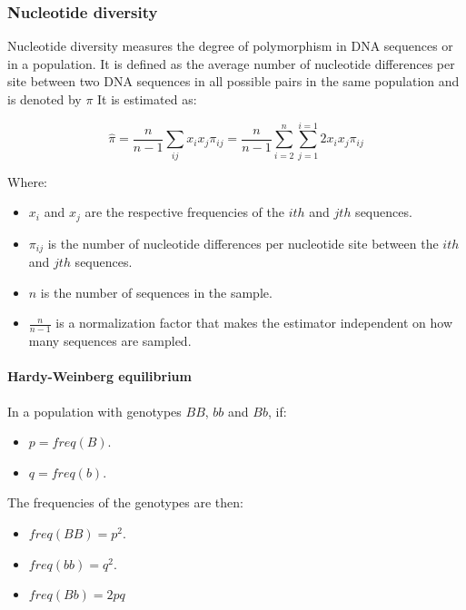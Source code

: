 		\subsubsection{Nucleotide diversity}
		Nucleotide diversity measures the degree of polymorphism in DNA sequences or in a population.
		It is defined as the average number of nucleotide differences per site between two DNA sequences in all possible pairs in the same population and is denoted by $\pi$
		It is estimated as:

		$$\hat{\pi} = \frac{n}{n-1}\sum\limits_{ij} x_ix_j\pi_{ij} = \frac{n}{n-1} \sum\limits_{i=2}^n\sum\limits_{j=1}^{i=1}2x_ix_j\pi_{ij}$$

		Where:

		\begin{multicols}{2}
			\begin{itemize}
				\item $x_i$ and $x_j$ are the respective frequencies of the $ith$ and $jth$ sequences.
				\item	$\pi_{ij}$ is the number of nucleotide differences per nucleotide site between the $ith$ and $jth$ sequences.
				\item $n$ is the number of sequences in the sample.
				\item $\frac{n}{n-1}$ is a normalization factor that makes the estimator independent on how many sequences are sampled.
			\end{itemize}
		\end{multicols}

			\paragraph{Hardy-Weinberg equilibrium}
			In a population with genotypes $BB$, $bb$ and $Bb$, if:

			\begin{multicols}{2}
				\begin{itemize}
					\item $p = freq(B)$.
					\item $q = freq(b)$.
				\end{itemize}
			\end{multicols}

			The frequencies of the genotypes are then:

			\begin{multicols}{3}
				\begin{itemize}
					\item $freq(BB) = p^2$.
					\item $freq(bb) = q^2$.
					\item $freq(Bb) = 2pq$
				\end{itemize}
			\end{multicols}


